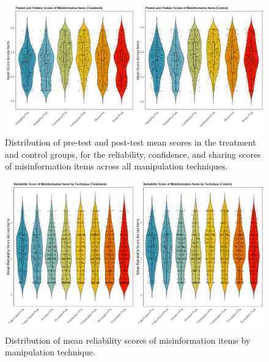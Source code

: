 \documentclass[empirical, authordate, issue]{jote-new-article}
\begin{document}
\begin{figure}[t]

  \begin{fullwidth}
    \includegraphics[width=\linewidth]{media/image4.jpeg}
    \caption{Distribution of pre-test and post-test mean scores in the treatment and control groups, for the reliability, confidence, and sharing scores of misinformation items across all manipulation techniques.}
    \label{fig:figure4}
  \end{fullwidth}


\end{figure}




\begin{figure}[t]

  \begin{fullwidth}
    \includegraphics[width=\linewidth]{media/image3.jpeg}
    \caption{Distribution of mean reliability scores of misinformation items by manipulation technique. }
    \label{fig:figure5}
  \end{fullwidth}


\end{figure}
\end{document}

